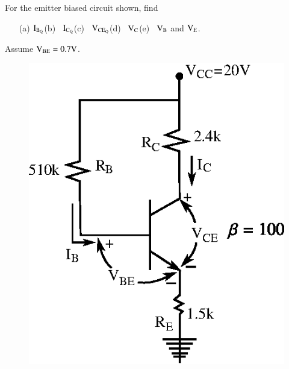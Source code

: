 \begin{problem}\label{prob3.4}
For the emitter biased circuit shown, find 
\begin{itemize}
\item[(a)] $\textrm{I}_{\textrm{B}_{\textrm{Q}}}$\quad (b)~ $\textrm{I}_{\textrm{C}_{\textrm{Q}}}$\quad (c)~ $\textrm{V}_{\text{CE}_{\textrm{Q}}}$\quad (d)~ $\textrm{V}_{\textrm{C}}$\quad (e)~ $\textrm{V}_{\textrm{B}}$ and $\textrm{V}_{\textrm{E}}$.
\end{itemize}
Assume $\textrm{V}_{\text{BE}}=0.7\textrm{V}$.
\begin{figure}[H]
\centering
\includegraphics{chap3/fig3.12.eps}
\end{figure}
\end{problem}

